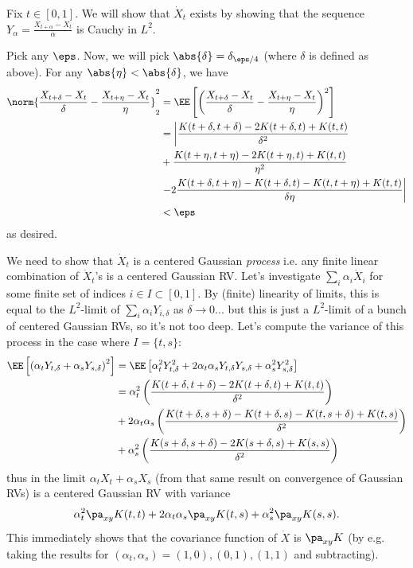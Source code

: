 \documentclass{scrartcl}
\begin{document}
Fix $t\in [0,1]$. We will show that $\dot{X}_t$ exists by showing that the sequence $Y_\alpha = \frac{X_{t + \alpha} - X_t}{\alpha}$ is Cauchy in $L^2$.

Pick any $\eps$. Now, we will pick $\abs{\delta} = \delta_{\eps / 4}$ (where $\delta$ is defined as above). For any $\abs{\eta} < \abs{\delta}$, we have
\begin{align*}
    \norm{\frac{X_{t + \delta} - X_t}{\delta} - \frac{X_{t + \eta} - X_t}{\eta}}_2^2 &= \EE\left[\left(\frac{X_{t + \delta} - X_t}{\delta} - \frac{X_{t + \eta} - X_t}{\eta}\right)^2\right]\\
    &= \left\vert\frac{K(t + \delta, t + \delta) - 2K(t + \delta, t) + K(t,t)}{\delta^2}\right.\\
    &+ \frac{K(t + \eta, t + \eta) - 2K(t + \eta, t) + K(t,t)}{\eta^2}\\
    &\left.- 2\frac{K(t + \delta, t + \eta) - K(t + \delta, t) - K(t , t+ \eta) + K(t,t)}{\delta\eta}\right\vert\\
    & < \eps
\end{align*}
as desired.

We need to show that $\dot{X}_t$ is a centered Gaussian \emph{process} i.e. any finite linear combination of $\dot{X}_t$'s is a centered Gaussian RV.
Let's investigate $\sum_i \alpha_i \dot{X}_i$ for some finite set of indices $i\in I\subset [0,1]$. By (finite) linearity of limits, this is equal to the $L^2$-limit of $\sum_i \alpha_i Y_{i, \delta}$ as $\delta \to 0$... but this is just a $L^2$-limit of a bunch of centered Gaussian RVs, so it's not too deep.  Let's compute the variance of this process in the case where $I = \{t,s\}$:
\begin{align*}
    \EE\left[ \left(\alpha_t Y_{t,\delta} + \alpha_s Y_{s,\delta}\right)^2\right] &= \EE\left[\alpha_t^2 Y_{t,\delta}^2 + 2\alpha_t\alpha_s Y_{t,\delta}Y_{s,\delta} + \alpha_s^2 Y_{s,\delta}^2\right]\\
    &= \alpha_t^2 \left( \frac{K(t + \delta, t + \delta) - 2K(t + \delta, t) + K(t,t)}{\delta^2}\right)\\
    &+ 2\alpha_t\alpha_s \left( \frac{K(t + \delta, s + \delta) - K(t + \delta, s) - K(t , s+ \delta) + K(t,s)}{\delta^2}\right)\\
    &+ \alpha_s^2 \left( \frac{K(s + \delta, s + \delta) - 2K(s + \delta, s) + K(s,s)}{\delta^2}\right)
\end{align*}
thus in the limit $\alpha_t X_t + \alpha_s X_s$ (from that same result on convergence of Gaussian RVs) is a centered Gaussian RV with variance
\[
    \alpha_t^2 \pa_{xy} K(t,t) + 2\alpha_t\alpha_s \pa_{xy} K(t,s) + \alpha_s^2 \pa_{xy} K(s,s).    
\]
This immediately shows that the covariance function of $\dot{X}$ is $\pa_{xy} K$ (by e.g. taking the results for $(\alpha_t, \alpha_s) = (1,0), (0,1), (1,1)$ and subtracting).
\end{document}

